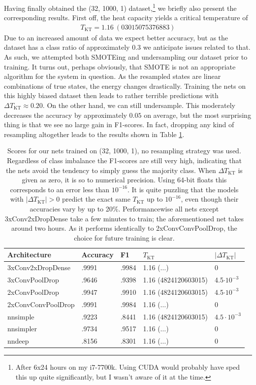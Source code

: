 \documentclass[]{article}
\begin{document}
Having finally obtained the (32, 1000, 1) dataset,\footnote{After 6x24 hours on my i7-7700k. Using CUDA would probably have sped this up quite significantly, but I wasn't aware of it at the time.} we briefly also present the corresponding results. First off, the heat capacity yields a critical temperature of
\begin{align}
T_\text{KT} = 1.16\ (03015075376883)
\end{align}
Due to an increased amount of data we expect better accuracy, but as the dataset has a class ratio of approximately 0.3 we anticipate issues related to that. As such, we attempted both SMOTEing and undersampling our dataset prior to training. It turns out, perhaps obviously, that SMOTE is not an appropriate algorithm for the system in question. As the resampled states are linear combinations of true states, the energy changes drastically. Training the nets on this highly biased dataset then leads to rather terrible predictions with $\Delta T_\text{KT} \approx 0.20$. On the other hand, we can still undersample. This moderately decreases the accuracy by approximately $0.05$ on average, but the most surprising thing is that we see no large gain in F1-scores. In fact, dropping any kind of resampling altogether leads to the results shown in Table \ref{tab:cnn_scores_32}.

\begin{table}[H]
	\centering
	\begin{tabular}{l|l|l|l|l}
		Architecture & Accuracy & F1 & $T_\text{KT}$ & $|\Delta T_\text{KT}|$ \\
		\hline 
		3xConv2xDropDense & .9991 & .9984 & 1.16 ($\dots$) & 0  \\
		3xConvPoolDrop & .9646 & .9398 & 1.16 (4824120603015) & 4.5$\cdot 10^{-3}$  \\
		2xConvPoolDrop & .9947 & .9910 & 1.16 (4824120603015) &  4.5$\cdot 10^{-3}$ \\
		2xConvConvPoolDrop & .9991 & .9984 & 1.16 ($\dots$) & 0 \\
		\hline
		nnsimple & .9223 & .8441 & 1.16 (4824120603015) & $4.5\cdot 10^{-3}$\\
		nnsimpler & .9734 & .9517 & 1.16 ($\dots$) & 0 \\
		nndeep & .8156 & .8301 & 1.16 ($\dots$) & 0
	\end{tabular}
	\caption{Scores for our nets trained on (32, 1000, 1), no resampling strategy was used. Regardless of class imbalance the F1-scores are still very high, indicating that the nets avoid the tendency to simply guess the majority class. When $\Delta T_\text{KT}$ is given as zero, it is so to numerical precision. Using 64-bit floats this corresponds to an error less than $10^{-16}$. It is quite puzzling that the models with $|\Delta T_\text{KT}| > 0$ predict the exact same $T_\text{KT}$ up to $10^{-16}$, even though their accuracies vary by up to 20\%. Performancewise all nets except 3xConv2xDropDense take a few minutes to train; the aforementioned net takes around two hours. As it performs identically to 2xConvConvPoolDrop, the choice for future training is clear.}
	\label{tab:cnn_scores_32}
\end{table}
\end{document}
